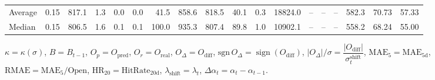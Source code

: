 \begin{threeparttable}
{\begin{tabular}{lrrrrrrrrrrrrrrrrr}
Average &     0.15 & 817.1 &               1.3 &               0.0 &                0.0 &               41.5 &   858.6 & 818.5 &       40.1 &                      0.3 &             18824.0 &         -- &        -- &             -- &            582.3 &           70.73 &                  57.33 \\
 Median &     0.15 & 806.5 &               1.6 &               0.1 &                0.1 &              100.0 &   935.3 & 807.4 &       89.8 &                      1.0 &             10902.1 &         -- &        -- &             -- &            558.2 &           68.24 &                  55.00 \\
\bottomrule
\end{tabular}
}
\begin{tablenotes}\footnotesize
\item $\kappa=\kappa(\sigma)$, $B=B_{t-1}$, $O_p=O_{\text{pred}}$, $O_r=O_{\text{real}}$, $O_\Delta=O_{\text{diff}}$, $\mathrm{sgn}\,O_\Delta=\operatorname{sign}(O_{\text{diff}})$, $|O_\Delta|/\sigma=\dfrac{|O_{\text{diff}}|}{\sigma_t^{\text{shift}}}$, $\mathrm{MAE}_5=\mathrm{MAE}_{5\text{d}}$, $\mathrm{RMAE}= \mathrm{MAE}_5 / \text{Open}$, $\mathrm{HR}_{20}=\mathrm{HitRate}_{20\text{d}}$, 
$\lambda_{\text{shift}}=\lambda_t$, 
$\Delta\alpha_t=\alpha_t-\alpha_{t-1}$.
\end{tablenotes}
\end{threeparttable}
\endgroup

